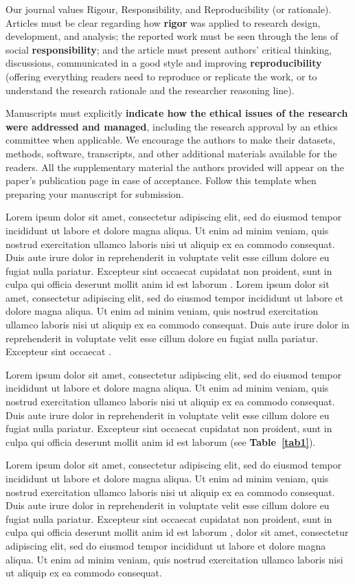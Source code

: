 \documentclass{sbc2023}%
\begin{document}
Our journal values Rigour, Responsibility, and Reproducibility (or rationale). Articles must be clear regarding how \textbf{rigor} was applied to research design, development, and analysis; the reported work must be seen through the lens of social \textbf{responsibility}; and the article must present authors' critical thinking, discussions, communicated in a good style and improving \textbf{reproducibility} (offering everything readers need to reproduce or replicate the work, or to understand the research rationale and the researcher reasoning line).

Manuscripts must explicitly \textbf{indicate how the ethical issues of the research were addressed and managed}, including the research approval by an ethics committee when applicable. We encourage the authors to make their datasets, methods, software, transcripts, and other additional materials available for the readers. All the supplementary material the authors provided will appear on the paper's publication page in case of acceptance. Follow this template when preparing your manuscript for submission. 

Lorem ipsum dolor sit amet, consectetur adipiscing elit, sed do eiusmod tempor incididunt ut labore et dolore magna aliqua. Ut enim ad minim veniam, quis nostrud exercitation ullamco laboris nisi ut aliquip ex ea commodo consequat. Duis aute irure dolor in reprehenderit in voluptate velit esse cillum dolore eu fugiat nulla pariatur. Excepteur sint occaecat cupidatat non proident, sunt in culpa qui officia deserunt mollit anim id est laborum \citep{ref1}. Lorem ipsum dolor sit amet, consectetur adipiscing elit, sed do eiusmod tempor incididunt ut labore et dolore magna aliqua. Ut enim ad minim veniam, quis nostrud exercitation ullamco laboris nisi ut aliquip ex ea commodo consequat. Duis aute irure dolor in reprehenderit in voluptate velit esse cillum dolore eu fugiat nulla pariatur. Excepteur sint occaecat \citep{ref2}. 

Lorem ipsum dolor sit amet, consectetur adipiscing elit, sed do eiusmod tempor incididunt ut labore et dolore magna aliqua. Ut enim ad minim veniam, quis nostrud exercitation ullamco laboris nisi ut aliquip ex ea commodo consequat. Duis aute irure dolor in reprehenderit in voluptate velit esse cillum dolore eu fugiat nulla pariatur. Excepteur sint occaecat cupidatat non proident, sunt in culpa qui officia deserunt mollit anim id est laborum (see \textbf{ Table~\ref{tab1}}).

Lorem ipsum dolor sit amet, consectetur adipiscing elit, sed do eiusmod tempor incididunt ut labore et dolore magna aliqua. Ut enim ad minim veniam, quis nostrud exercitation ullamco laboris nisi ut aliquip ex ea commodo consequat. Duis aute irure dolor in reprehenderit in voluptate velit esse cillum dolore eu fugiat nulla pariatur. Excepteur sint occaecat cupidatat non proident, sunt in culpa qui officia deserunt mollit anim id est laborum \citep{ref3}, dolor sit amet, consectetur adipiscing elit, sed do eiusmod tempor incididunt ut labore et dolore magna aliqua. Ut enim ad minim veniam, quis nostrud exercitation ullamco laboris nisi ut aliquip ex ea commodo consequat.
\end{document}
